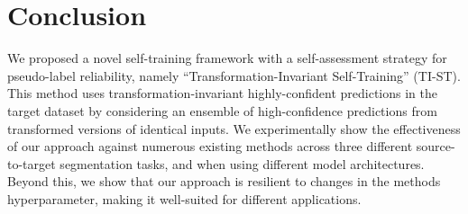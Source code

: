 \section{Conclusion}
\label{sec: conclusion}

We proposed a novel self-training framework with a self-assessment strategy for pseudo-label reliability, namely ``Transformation-Invariant Self-Training'' (TI-ST). This method uses transformation-invariant highly-confident predictions in the target dataset by considering an ensemble of high-confidence predictions from transformed versions of identical inputs. We experimentally show the effectiveness of our approach against numerous existing methods across three different source-to-target segmentation tasks, and when using different model architectures. Beyond this, we show that our approach is resilient to changes in the methods hyperparameter, making it well-suited for different applications. 